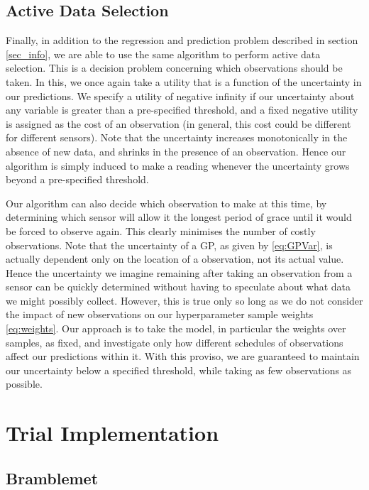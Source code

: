 \documentclass{acmtrans2m}
\begin{document}
\subsection{Active Data Selection}

\noindent Finally, in addition to the regression and prediction problem described in section \ref{sec_info}, we are able to use the same algorithm to perform active data selection. This is a decision problem concerning which observations should be taken. In this, we once again take a utility that is a function of the uncertainty in our predictions. We specify a utility of negative infinity if our uncertainty about any variable is greater than a pre-specified threshold, and a fixed negative utility is assigned as the cost of an observation (in general, this cost could be different for different sensors). Note that the uncertainty increases monotonically in the absence of new data, and shrinks in the presence of an observation. Hence our algorithm is simply induced to make a reading whenever the uncertainty grows beyond a pre-specified threshold. 

Our algorithm can also decide which observation to make at this time, by determining which sensor will allow it the longest period of grace until it would be forced to observe again. This clearly minimises the number of costly observations. Note that the uncertainty of a GP, as given by \eqref{eq:GPVar}, is actually dependent only on the location of a observation, not its actual value. Hence the uncertainty we imagine remaining after taking an observation from a sensor can be quickly determined without having to speculate about what data we might possibly collect. However, this is true only so long as we do not consider the impact of new observations on our hyperparameter sample weights \eqref{eq:weights}. Our approach is to take the model, in particular the weights over samples, as fixed, and investigate only how different schedules of observations affect our predictions within it. With this proviso, we are guaranteed to maintain our uncertainty below a specified threshold, while taking as few observations as possible.

\section{Trial Implementation}\label{sec_implementation}

\subsection{Bramblemet}
\end{document}
